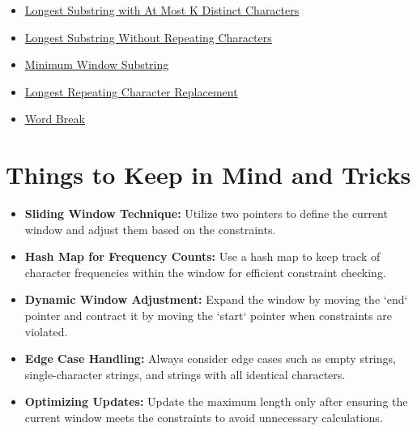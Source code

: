 \begin{itemize}
    \item \hyperref[problem:longest_substring_with_at_most_k_distinct_characters]{Longest Substring with At Most K Distinct Characters}
    \item \hyperref[problem:longest_substring_without_repeating_characters]{Longest Substring Without Repeating Characters}
    \item \hyperref[problem:minimum_window_substring]{Minimum Window Substring}
    \item \hyperref[problem:longest_repeating_character_replacement]{Longest Repeating Character Replacement}
    \item \hyperref[problem:word_break]{Word Break}
\end{itemize}

\section*{Things to Keep in Mind and Tricks}

\begin{itemize}
    \item \textbf{Sliding Window Technique:} Utilize two pointers to define the current window and adjust them based on the constraints.
    
    \item \textbf{Hash Map for Frequency Counts:} Use a hash map to keep track of character frequencies within the window for efficient constraint checking.
    
    \item \textbf{Dynamic Window Adjustment:} Expand the window by moving the `end` pointer and contract it by moving the `start` pointer when constraints are violated.
    
    \item \textbf{Edge Case Handling:} Always consider edge cases such as empty strings, single-character strings, and strings with all identical characters.
    
    \item \textbf{Optimizing Updates:} Update the maximum length only after ensuring the current window meets the constraints to avoid unnecessary calculations.
\end{itemize}

